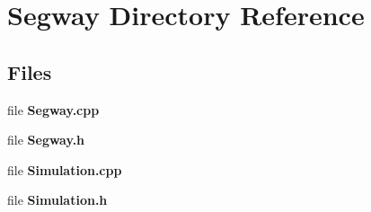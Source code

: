 \section{Segway Directory Reference}
\label{dir_b05978668a901b5ff47ce36b2119970a}
\subsection*{Files}
\begin{DoxyCompactItemize}
\item 
file {\bfseries Segway.\+cpp}
\item 
file {\bfseries Segway.\+h}
\item 
file {\bfseries Simulation.\+cpp}
\item 
file {\bfseries Simulation.\+h}
\end{DoxyCompactItemize}
